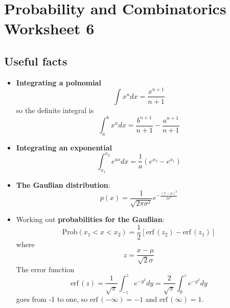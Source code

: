 \documentclass[11pt,a4paper]{scrartcl}
\begin{document}
\section*{Probability and Combinatorics Worksheet 6}

\subsection*{Useful facts}

\begin{itemize}


\item \textbf{Integrating a polnomial}
\begin{equation}
\int x^n dx=\frac{x^{n+1}}{n+1}
\end{equation}
so the definite integral is
\begin{equation}
\int_{a}^b x^n dx=\frac{b^{n+1}}{n+1}-\frac{a^{n+1}}{n+1}
\end{equation}


\item \textbf{Integrating an exponential}
\begin{equation}
\int_{x_1}^{x_2} e^{ax} dx=\frac{1}{a}\left(e^{x_2}-e^{x_1}\right)
\end{equation}


\item \textbf{The Gau\ss{}ian distribution}:
  \begin{equation}
    p(x)=\frac{1}{\sqrt{2\pi\sigma^2}}e^{-\frac{(x-\mu)^2}{2\sigma^2}}
  \end{equation}
  

\item Working out \textbf{probabilities for the Gau\ss{}ian}:
  \begin{equation}
\mbox{Prob}(x_1<x<x_2)=\frac{1}{2}[\mbox{erf}\,(z_2)-\mbox{erf}\,(z_1)]
  \end{equation}
where
\begin{equation}
z=\frac{x-\mu}{\sqrt{2}\sigma}
\end{equation}
The error function 
\begin{equation}
  \mbox{erf}\,(z)=\frac{1}{\sqrt{\pi}}\int_{-z}^ze^{-y^2}dy=\frac{2}{\sqrt{\pi}}\int_0^ze^{-y^2}dy
\end{equation}
goes from -1 to one, so $\mbox{erf}\,(-\infty)=-1$ and $\mbox{erf}\,(\infty)=1$.


  
\end{itemize}
\end{document}
